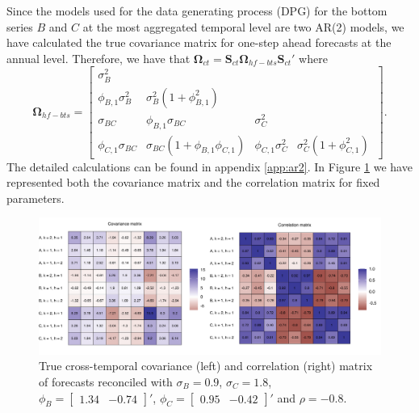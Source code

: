 \documentclass[a4paper,11pt]{article}
\newcommand{\Svet}{\bm{S}}
\newcommand{\Omegavet}{\bm{\Omega}}
\theoremstyle{definition}
\begin{document}
Since the models used for the data generating process (DPG) for the bottom series $B$ and $C$ at the most aggregated temporal level are two AR(2) models, we have calculated the true covariance matrix for one-step ahead forecasts at the annual level. Therefore, we have that $\Omegavet_{ct} = \Svet_{ct}\Omegavet_{hf-bts}\Svet_{ct}'$ where
$$
\Omegavet_{hf-bts} = \begin{bmatrix}
\sigma^2_B & & & \\
\phi_{B,1}\sigma_B^2 & \sigma_B^2\left(1+\phi_{B,1}^2\right) & & \\
\sigma_{BC} & \phi_{B,1}\sigma_{BC} & \sigma_C^2& \\
\phi_{C,1}\sigma_{BC} & \sigma_{BC}\left(1+\phi_{B,1}\phi_{C,1} \right)& \phi_{C,1}\sigma_C^2 & \sigma_C^2\left(1+\phi_{C,1}^2\right)\
\end{bmatrix}.
$$
The detailed calculations can be found in appendix \ref{app:ar2}.
In Figure \ref{fig:covcorMC} we have represented both the covariance matrix and the correlation matrix for fixed parameters. 

\begin{figure}[t]
\centering
\includegraphics[width = \linewidth]{fig/simAR/covcor.pdf}
\caption{True cross-temporal covariance (left) and correlation (right) matrix of forecasts reconciled with $\sigma_B = 0.9$, $\sigma_C = 1.8$, $\phi_B =  \begin{bmatrix} 1.34 & -0.74 \end{bmatrix}'$, $\phi_C = \begin{bmatrix} 0.95 & -0.42 \end{bmatrix}'$ and $\rho = -0.8$.}
\label{fig:covcorMC}
\end{figure}
\end{document}

